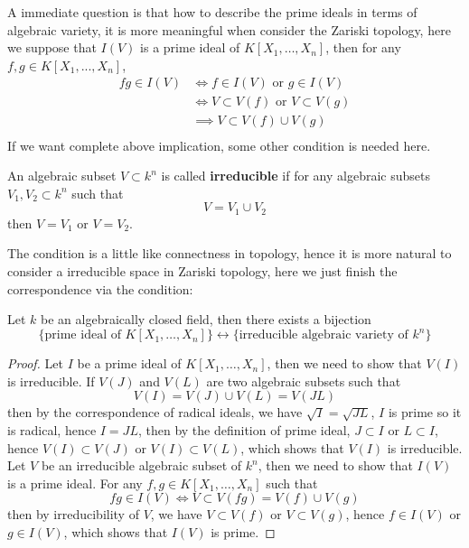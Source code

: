 A immediate question is that how to describe the prime ideals in terms of algebraic variety, it is more meaningful when consider the Zariski topology, here we suppose that \(I(V)\) is a prime ideal of \(K[X_1,\dots,X_n]\), then for any \(f,g \in K[X_1,...,X_n]\),
\begin{align*}
    fg \in I(V) &\iff f \in I(V) \text{ or } g \in I(V)\\
    &\iff V \subset V(f) \text{ or } V \subset V(g)\\
    &\implies V \subset V(f)\cup V(g)\\
\end{align*}
If we want complete above implication, some other condition is needed here.
\begin{definition}
    An algebraic subset \(V \subset k^n\) is called \textbf{irreducible} if for any algebraic subsets \(V_1,V_2 \subset k^n\) such that
    \[V = V_1 \cup V_2\]
    then \(V = V_1\) or \(V = V_2\).\\
\end{definition}

The condition is a little like connectness in topology, hence it is more natural to consider a irreducible space in Zariski topology, here we just finish the correspondence via the condition:

\begin{proposition}
    Let \(k\) be an algebraically closed field, then there exists a bijection
    \[\{\text{prime ideal of } K[X_1,\dots,X_n]\} \longleftrightarrow \{\text{irreducible algebraic variety of } k^n\}\]
\end{proposition}
\begin{proof}
    Let \(I\) be a prime ideal of \(K[X_1,\dots,X_n]\), then we need to show that \(V(I)\) is irreducible. If \(V(J)\) and \(V(L)\) are two algebraic subsets such that
    \[V(I) = V(J) \cup V(L) = V(JL)\]
    then by the correspondence of radical ideals, we have \(\sqrt{I} = \sqrt{JL}\), \(I\) is prime so it is radical, hence \(I = JL\), then by the definition of prime ideal, \(J \subset I\) or \(L \subset I\), hence \(V(I) \subset V(J)\) or \(V(I) \subset V(L)\), which shows that \(V(I)\) is irreducible.\\

    Let \(V\) be an irreducible algebraic subset of \(k^n\), then we need to show that \(I(V)\) is a prime ideal. For any \(f,g \in K[X_1,\dots,X_n]\) such that
    \[fg \in I(V) \iff V \subset V(fg) = V(f) \cup V(g)\]
    then by irreducibility of \(V\), we have \(V \subset V(f)\) or \(V \subset V(g)\), hence \(f \in I(V)\) or \(g \in I(V)\), which shows that \(I(V)\) is prime.
\end{proof}

